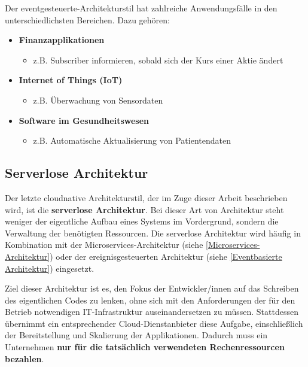         Der eventgesteuerte-Architekturstil hat zahlreiche Anwendungsfälle in den unterschiedlichsten Bereichen.
        Dazu gehören:
        \begin{itemize}
            \item \textbf{Finanzapplikationen}
            \begin{itemize}[label=$\circ$]
                \item z.B. Subscriber informieren, sobald sich der Kurs einer Aktie ändert
            \end{itemize}

            \item \textbf{Internet of Things (IoT)}
            \begin{itemize}[label=$\circ$]
                \item z.B. Überwachung von Sensordaten
            \end{itemize}

            \item \textbf{Software im Gesundheitswesen}
            \begin{itemize}[label=$\circ$]
                \item z.B. Automatische Aktualisierung von Patientendaten
            \end{itemize}
        \end{itemize}

        \cite{EA:Web64} \cite[S. 184]{EA:Book02}

    \clearpage


    
    \subsection{Serverlose Architektur}

    Der letzte cloudnative Architekturstil, der im Zuge dieser Arbeit beschrieben wird, ist die \textbf{serverlose Architektur}. 
    Bei dieser Art von Architektur steht weniger der eigentliche Aufbau eines Systems im Vordergrund, sondern die Verwaltung der benötigten Ressourcen. Die serverlose Architektur wird häufig in Kombination mit der Microservices-Architektur (siehe \ref{Microservices-Architektur}) oder der ereignisgesteuerten Architektur (siehe \ref{Eventbasierte Architektur}) eingesetzt. 

    Ziel dieser Architektur ist es, den Fokus der Entwickler/innen auf das Schreiben des eigentlichen Codes zu lenken, ohne sich mit den Anforderungen der für den Betrieb notwendigen IT-Infrastruktur auseinandersetzen zu müssen. Stattdessen übernimmt ein entsprechender Cloud-Dienstanbieter diese Aufgabe, einschließlich der Bereitstellung und Skalierung der Applikationen. Dadurch muss ein Unternehmen \textbf{nur für die tatsächlich verwendeten Rechenressourcen bezahlen}.

